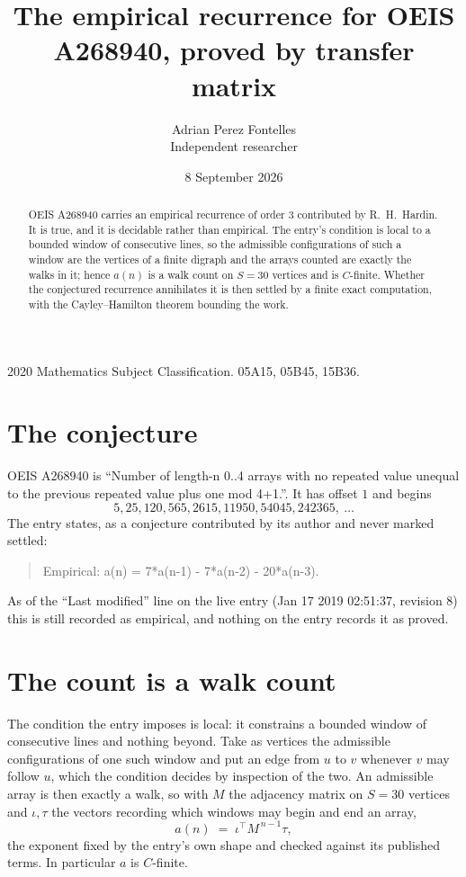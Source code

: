 \documentclass[11pt,a4paper]{article}
\title{The empirical recurrence for OEIS A268940, proved by transfer matrix}
\author{Adrian Perez Fontelles\\ \small Independent researcher}
\date{8 September 2026}
\theoremstyle{plain}
\theoremstyle{definition}
\begin{document}
\maketitle

\begin{abstract}
OEIS A268940 carries an empirical recurrence of order $3$ contributed by R.~H.~Hardin. It is
true, and it is decidable rather than empirical. The entry's condition is local to a bounded window of consecutive lines, so
the admissible configurations of such a window are the vertices of a finite digraph and the
arrays counted are exactly the walks in it; hence $a(n)$ is a walk count on $S=30$ vertices
and is $C$-finite. Whether the conjectured recurrence annihilates it is then settled by a
finite exact computation, with the Cayley--Hamilton theorem bounding the work.
\end{abstract}

\noindent\small 2020 Mathematics Subject Classification. 05A15, 05B45, 15B36.\normalsize

\section{The conjecture}

OEIS A268940 is ``Number of length-n 0..4 arrays with no repeated value unequal to the previous repeated value plus one mod 4+1.''. It has offset $1$ and begins
\[
5, 25, 120, 565, 2615, 11950, 54045, 242365,\ \dots
\]
The entry states, as a conjecture contributed by its author and never marked settled:
\begin{quote}
Empirical: a(n) = 7*a(n-1) - 7*a(n-2) - 20*a(n-3).
\end{quote}
As of the ``Last modified'' line on the live entry (Jan 17 2019 02:51:37, revision 8) this is still
recorded as empirical, and nothing on the entry records it as proved.

\section{The count is a walk count}

The condition the entry imposes is local: it constrains a bounded window of consecutive lines and nothing beyond. Take as
vertices the admissible configurations of one such window and put an edge from $u$ to $v$
whenever $v$ may follow $u$, which the condition decides by inspection of the two. An
admissible array is then exactly a walk, so with $M$ the adjacency matrix on $S=30$ vertices
and $\iota,\tau$ the vectors recording which windows may begin and end an array,
\[
a(n)\;=\;\iota^{\!\top}M^{\,n-1}\tau ,
\]
the exponent fixed by the entry's own shape and checked against its published terms. In
particular $a$ is $C$-finite.
\end{document}
